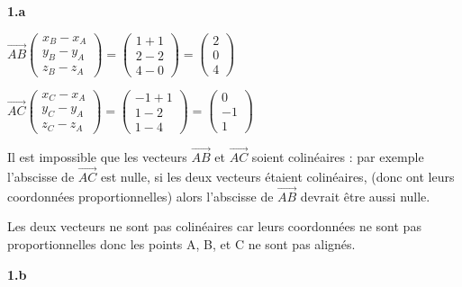 \documentclass{article}
\begin{document}
\textbf{1.a}

\vspace{2mm}

\noindent 

$\overrightarrow{AB}
\begin{pmatrix}
   x_B-x_A\\
   y_B-y_A\\
   z_B-z_A
\end{pmatrix}
=
\begin{pmatrix}
   1+1\\
   2-2\\
   4-0
\end{pmatrix}
= 
\begin{pmatrix}
   2\\
   0\\
   4
\end{pmatrix}
$

\vspace{2mm}

$\overrightarrow{AC}
\begin{pmatrix}
   x_C-x_A\\
   y_C-y_A\\
   z_C-z_A
\end{pmatrix}
=
\begin{pmatrix}
   -1+1\\
   1-2\\
   1-4
\end{pmatrix}
= 
\begin{pmatrix}
   0\\
   -1\\
   1
\end{pmatrix}
$
\vspace{2mm}

\noindent Il est impossible que les vecteurs $\overrightarrow{AB}$ et $\overrightarrow{AC}$ soient colinéaires : par exemple l'abscisse de $\overrightarrow{AC}$ est nulle, si les deux vecteurs étaient colinéaires, (donc ont leurs coordonnées proportionnelles) alors l'abscisse de $\overrightarrow{AB}$ devrait être aussi nulle. 

\vspace{2mm}

\noindent Les deux vecteurs ne sont pas colinéaires car leurs coordonnées ne sont pas proportionnelles donc les points A, B, et C ne sont pas alignés.

\vspace{2mm}

\textbf{1.b}
\end{document}
